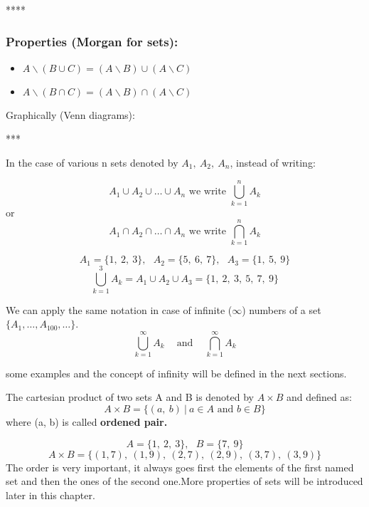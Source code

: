 \documentclass[12pt, a4paper]{book}
\begin{document}
****

\subsubsection*{Properties (Morgan for sets): }

\begin{itemize}
  \item $A \backslash (B \cup C) = (A \backslash B) \cup (A \backslash C)$
  \item $A \backslash (B \cap C) = (A \backslash B) \cap (A \backslash C)$
\end{itemize}

Graphically (Venn diagrams):

***

\begin{note}
  In the case of various n sets denoted by $A_1, \ A_2, \ A_n$, instead of writing:

  \[
    A_1 \cup A_2 \cup \ldots \cup A_n \text{ we write } \bigcup_{k=1}^{n} A_k
  \]
  or
  \[
    A_1 \cap A_2 \cap \ldots \cap A_n \text{ we write } \bigcap_{k=1}^{n} A_k
  \]
\end{note}

\begin{exmp}
  \[
    A_1=\{1, \ 2, \ 3 \}, \ \ \ A_2=\{ 5,\ 6, \ 7 \}, \ \ \ A_3= \{1, \ 5, \ 9 \}
  \]
  \[
    \bigcup_{k=1}^{3} A_k=A_1 \cup A_2 \cup A_3 = \{ 1, \ 2, \ 3, \ 5, \ 7, \ 9 \}
  \]
\end{exmp}

\begin{rem}
We can apply the same notation in case of infinite ($\infty$) numbers of a set $\{ A_1, \ldots, A_{100}, \ldots \}$.
\[
  \displaystyle\bigcup_{k=1}^{\infty}A_k \ \ \ \ \text{ and } \ \ \ \ \displaystyle\bigcap_{k=1}^{\infty}A_k
\]
\end{rem}
some examples and the concept of infinity will be defined in the next sections.

\begin{defn}
  The cartesian product of two sets A and B is denoted by \boldmath $A \times B$  and defined as:
  \[
    A \times B = \{ (a, \ b  ) \ | \ a \in A \text{ and } b \in B \}
  \]
  \unboldmath
  where (a, b) is called \textbf{ordened pair.} 
\end{defn}

\begin{exmp}
  \[
    A=\{1, \ 2, \ 3 \}, \ \ \ B=\{7, \ 9 \}
  \]
  \[
    A \times B= \{ (1,7), \ (1,9), \ (2,7), \ (2,9), \ (3,7), \ (3,9) \}
  \]
  The order is very important, it always goes first the elements of the first named set and then the ones of the second one.More properties of sets will be introduced later in this chapter.
\end{exmp}
\end{document}
